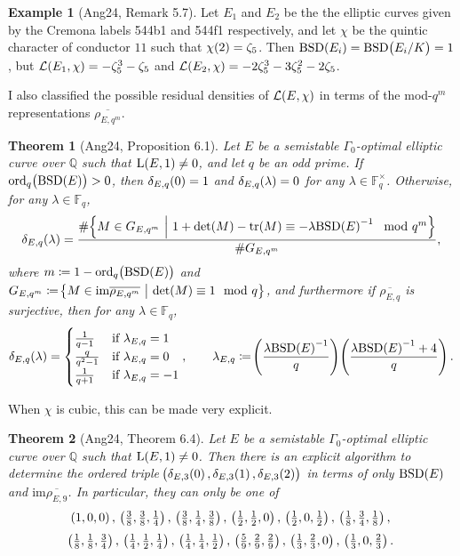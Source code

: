 \documentclass{article}
\theoremstyle{plain}
\newtheorem*{theorem}{Theorem}
\theoremstyle{definition}
\newtheorem*{example}{Example}
\newcommand{\BSD}{\mathrm{BSD}}
\newcommand{\FF}{\mathbb{F}}
\newcommand{\im}{\mathrm{im}}
\renewcommand{\L}{\mathrm{L}}
\newcommand{\LLL}{\mathcal{L}}
\newcommand{\ord}{\mathrm{ord}}
\newcommand{\QQ}{\mathbb{Q}}
\newcommand{\tr}{\mathrm{tr}}
\newcommand{\br}{\!\del}
\newcommand{\st}{\ \middle| \ }
\begin{document}
\begin{example}[Ang24, Remark 5.7]
Let $ E_1 $ and $ E_2 $ be the the elliptic curves given by the Cremona labels 544b1 and 544f1 respectively, and let $ \chi $ be the quintic character of conductor $ 11 $ such that $ \chi\br{2} = \zeta_5 $. Then $ \BSD\br{E_i} = \BSD\br{E_i / K} = 1 $, but $ \LLL\br{E_1, \chi} = -\zeta_5^3 - \zeta_5 $ and $ \LLL\br{E_2, \chi} = -2\zeta_5^3 - 3\zeta_5^2 - 2\zeta_5 $.
\end{example}

I also classified the possible residual densities of $ \LLL\br{E, \chi} $ in terms of the mod-$ q^m $ representations $ \overline{\rho_{E, q^m}} $.

\begin{theorem}[Ang24, Proposition 6.1]
Let $ E $ be a semistable $ \Gamma_0 $-optimal elliptic curve over $ \QQ $ such that $ \L\br{E, 1} \ne 0 $, and let $ q $ be an odd prime. If $ \ord_q\br{\BSD\br{E}} > 0 $, then $ \delta_{E, q}\br{0} = 1 $ and $ \delta_{E, q}\br{\lambda} = 0 $ for any $ \lambda \in \FF_q^\times $. Otherwise, for any $ \lambda \in \FF_q $,
$$ \delta_{E, q}\br{\lambda} = \dfrac{\#\cbr{M \in G_{E, q^m} \st 1 + \det\br{M} - \tr\br{M} \equiv -\lambda\BSD\br{E}^{-1} \mod q^m}}{\#G_{E, q^m}}, $$
where $ m \coloneqq 1 - \ord_q\br{\BSD\br{E}} $ and $ G_{E, q^m} \coloneqq \cbr{M \in \im\overline{\rho_{E, q^m}} \st \det\br{M} \equiv 1 \mod q} $, and furthermore if $ \overline{\rho_{E, q}} $ is surjective, then for any $ \lambda \in \FF_q $,
$$ \delta_{E, q}\br{\lambda} =
\begin{cases}
\tfrac{1}{q - 1} & \text{if} \ \lambda_{E, q} = 1 \\
\tfrac{q}{q^2 - 1} & \text{if} \ \lambda_{E, q} = 0 \\
\tfrac{1}{q + 1} & \text{if} \ \lambda_{E, q} = -1
\end{cases},
\qquad \lambda_{E, q} \coloneqq \br{\dfrac{\lambda\BSD\br{E}^{-1}}{q}}\br{\dfrac{\lambda\BSD\br{E}^{-1} + 4}{q}}. $$
\end{theorem}

When $ \chi $ is cubic, this can be made very explicit.

\begin{theorem}[Ang24, Theorem 6.4]
Let $ E $ be a semistable $ \Gamma_0 $-optimal elliptic curve over $ \QQ $ such that $ \L\br{E, 1} \ne 0 $. Then there is an explicit algorithm to determine the ordered triple $ \br{\delta_{E, 3}\br{0}, \delta_{E, 3}\br{1}, \delta_{E, 3}\br{2}} $ in terms of only $ \BSD\br{E} $ and $ \im\overline{\rho_{E, 9}} $. In particular, they can only be one of
$$ \br{1, 0, 0}, \ \br{\tfrac{3}{8}, \tfrac{3}{8}, \tfrac{1}{4}}, \ \br{\tfrac{3}{8}, \tfrac{1}{4}, \tfrac{3}{8}}, \ \br{\tfrac{1}{2}, \tfrac{1}{2}, 0}, \ \br{\tfrac{1}{2}, 0, \tfrac{1}{2}}, \ \br{\tfrac{1}{8}, \tfrac{3}{4}, \tfrac{1}{8}}, $$
$$ \br{\tfrac{1}{8}, \tfrac{1}{8}, \tfrac{3}{4}}, \ \br{\tfrac{1}{4}, \tfrac{1}{2}, \tfrac{1}{4}}, \ \br{\tfrac{1}{4}, \tfrac{1}{4}, \tfrac{1}{2}}, \ \br{\tfrac{5}{9}, \tfrac{2}{9}, \tfrac{2}{9}}, \ \br{\tfrac{1}{3}, \tfrac{2}{3}, 0}, \ \br{\tfrac{1}{3}, 0, \tfrac{2}{3}}. $$
\end{theorem}
\end{document}
